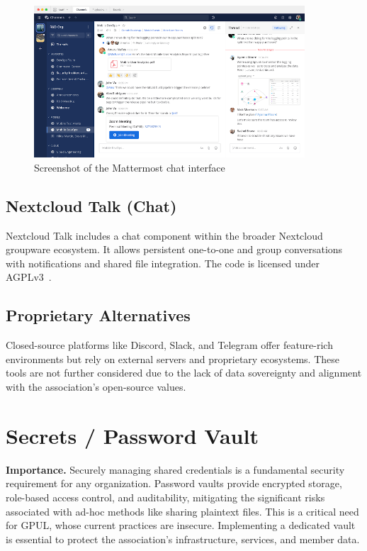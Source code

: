 \begin{figure}[H]
  \centering
  \includegraphics[width=0.9\textwidth]{imaxes/mattermost-ui.png}
  \caption{Screenshot of the Mattermost chat interface}
  \label{fig:mattermost-ui}
\end{figure}

\subsection*{Nextcloud Talk (Chat)}

Nextcloud Talk includes a chat component within the broader Nextcloud groupware ecosystem. It allows persistent one-to-one and group conversations with notifications and shared file integration. The code is licensed under AGPLv3~\cite{nextcloud-talk-docs}.

\subsection*{Proprietary Alternatives}

Closed-source platforms like Discord, Slack, and Telegram offer feature-rich environments but rely on external servers and proprietary ecosystems. These tools are not further considered due to the lack of data sovereignty and alignment with the association's open-source values.

\section{Secrets / Password Vault}

\textbf{Importance.} Securely managing shared credentials is a fundamental security requirement for any organization. Password vaults provide encrypted storage, role-based access control, and auditability, mitigating the significant risks associated with ad-hoc methods like sharing plaintext files. This is a critical need for GPUL, whose current practices are insecure. Implementing a dedicated vault is essential to protect the association's infrastructure, services, and member data.

